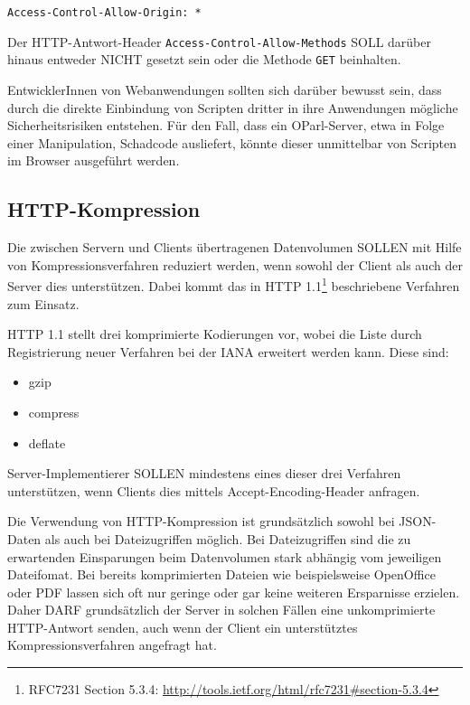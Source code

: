 \documentclass[,a4paper]{article}
\begin{document}
\begin{verbatim}
Access-Control-Allow-Origin: *
\end{verbatim}

Der HTTP-Antwort-Header \texttt{Access-Control-Allow-Methods} SOLL
darüber hinaus entweder NICHT gesetzt sein oder die Methode \texttt{GET}
beinhalten.

EntwicklerInnen von Webanwendungen sollten sich darüber bewusst sein,
dass durch die direkte Einbindung von Scripten dritter in ihre
Anwendungen mögliche Sicherheitsrisiken entstehen. Für den Fall, dass
ein OParl-Server, etwa in Folge einer Manipulation, Schadcode
ausliefert, könnte dieser unmittelbar von Scripten im Browser ausgeführt
werden.

\subsection{HTTP-Kompression}\label{http-kompression}

Die zwischen Servern und Clients übertragenen Datenvolumen SOLLEN mit
Hilfe von Kompressionsverfahren reduziert werden, wenn sowohl der Client
als auch der Server dies unterstützen. Dabei kommt das in HTTP
1.1\footnote{RFC7231 Section 5.3.4:
  \url{http://tools.ietf.org/html/rfc7231\#section-5.3.4}} beschriebene
Verfahren zum Einsatz.

HTTP 1.1 stellt drei komprimierte Kodierungen vor, wobei die Liste durch
Registrierung neuer Verfahren bei der IANA erweitert werden kann. Diese
sind:

\begin{itemize}
\itemsep1pt\parskip0pt
\item
  gzip
\item
  compress
\item
  deflate
\end{itemize}

Server-Implementierer SOLLEN mindestens eines dieser drei Verfahren
unterstützen, wenn Clients dies mittels Accept-Encoding-Header anfragen.

Die Verwendung von HTTP-Kompression ist grundsätzlich sowohl bei
JSON-Daten als auch bei Dateizugriffen möglich. Bei Dateizugriffen sind
die zu erwartenden Einsparungen beim Datenvolumen stark abhängig vom
jeweiligen Dateifomat. Bei bereits komprimierten Dateien wie
beispielsweise OpenOffice oder PDF lassen sich oft nur geringe oder gar
keine weiteren Ersparnisse erzielen. Daher DARF grundsätzlich der Server
in solchen Fällen eine unkomprimierte HTTP-Antwort senden, auch wenn der
Client ein unterstütztes Kompressionsverfahren angefragt hat.
\end{document}
